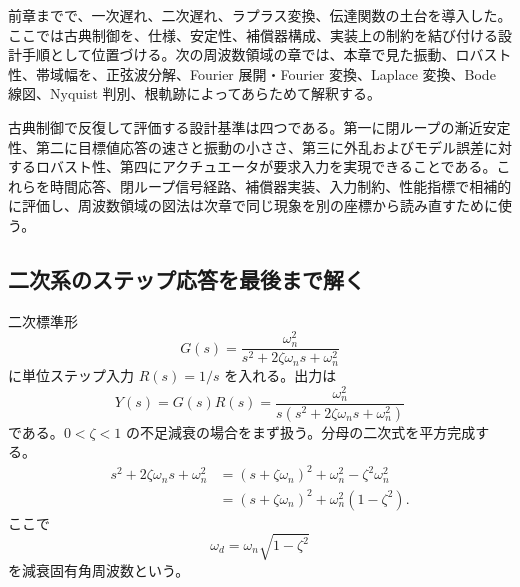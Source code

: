 前章までで、一次遅れ、二次遅れ、ラプラス変換、伝達関数の土台を導入した。ここでは古典制御を、仕様、安定性、補償器構成、実装上の制約を結び付ける設計手順として位置づける。次の周波数領域の章では、本章で見た振動、ロバスト性、帯域幅を、正弦波分解、Fourier 展開・Fourier 変換、Laplace 変換、Bode 線図、Nyquist 判別、根軌跡によってあらためて解釈する。

古典制御で反復して評価する設計基準は四つである。第一に閉ループの漸近安定性、第二に目標値応答の速さと振動の小ささ、第三に外乱およびモデル誤差に対するロバスト性、第四にアクチュエータが要求入力を実現できることである。これらを時間応答、閉ループ信号経路、補償器実装、入力制約、性能指標で相補的に評価し、周波数領域の図法は次章で同じ現象を別の座標から読み直すために使う。

\subsection{二次系のステップ応答を最後まで解く}

二次標準形
\begin{equation}
  G(s)=\frac{\omega_n^2}{s^2+2\zeta\omega_n s+\omega_n^2}
\end{equation}
に単位ステップ入力 $R(s)=1/s$ を入れる。出力は
\begin{equation}
  Y(s)=G(s)R(s)=
  \frac{\omega_n^2}{s(s^2+2\zeta\omega_n s+\omega_n^2)}
  \label{eq:second-order-step-laplace}
\end{equation}
である。$0<\zeta<1$ の不足減衰の場合をまず扱う。分母の二次式を平方完成する。
\begin{align}
  s^2+2\zeta\omega_n s+\omega_n^2
  &=(s+\zeta\omega_n)^2+\omega_n^2-\zeta^2\omega_n^2\\
  &=(s+\zeta\omega_n)^2+
    \omega_n^2(1-
    \zeta^2).
\end{align}
ここで
\begin{equation}
  \omega_d=\omega_n\sqrt{1-\zeta^2}
\end{equation}
を減衰固有角周波数という。

